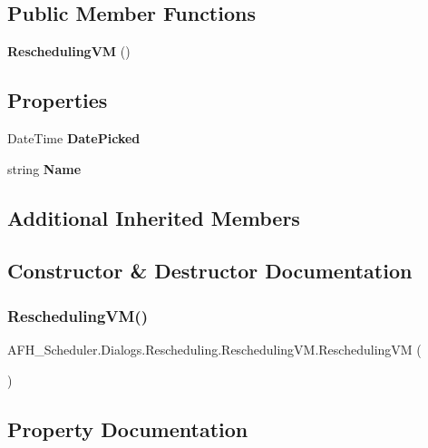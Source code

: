 \subsection*{Public Member Functions}
\begin{DoxyCompactItemize}
\item 
\textbf{ Rescheduling\+VM} ()
\end{DoxyCompactItemize}
\subsection*{Properties}
\begin{DoxyCompactItemize}
\item 
Date\+Time \textbf{ Date\+Picked}\hspace{0.3cm}{\ttfamily  [get, set]}
\item 
string \textbf{ Name}\hspace{0.3cm}{\ttfamily  [get]}
\end{DoxyCompactItemize}
\subsection*{Additional Inherited Members}


\subsection{Constructor \& Destructor Documentation}
\mbox{\label{class_a_f_h___scheduler_1_1_dialogs_1_1_rescheduling_1_1_rescheduling_v_m_a75ae0d76bbefc293526c222920b6b848}} 
\subsubsection{ReschedulingVM()}
{\footnotesize\ttfamily A\+F\+H\+\_\+\+Scheduler.\+Dialogs.\+Rescheduling.\+Rescheduling\+V\+M.\+Rescheduling\+VM (\begin{DoxyParamCaption}{ }\end{DoxyParamCaption})}



\subsection{Property Documentation}
\mbox{\label{class_a_f_h___scheduler_1_1_dialogs_1_1_rescheduling_1_1_rescheduling_v_m_a1506ca8817ec2014a0154062bc596ea9}} 
